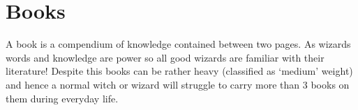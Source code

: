 \chapter{Books}\label{S:Books}

\newcommand\book[2]
{
	\vspace{2 ex}
	\small
	\vbox{
	{\bf #1}
	
	#2
	}
	\normalsize
}
\def\spellIntro{Spellbooks contain within them the information needed to cast spells. The rules for casting from spellbooks are detailed on page \pageref{S:Memory}.

For each topic\comma{} 5 books are listed in descending order. Each of these 5 books corresponds to one block of spells listed on page \pageref{S:SpellList}. {\it The Forbidden Arts}\comma{} the second Dark\minus{}Arts spellbook therefore contains all the level\minus{}2 Dark Arts spells\comma{} but not the level one spells. 
}
\def\normalIntro{Normal books fall into many different categories\comma{}. The list below contains an example of some of the most common topics of wizarding books\comma{} and a few examples of the most famous texts within those categories\comma{} where relevant. }

A book is a compendium of knowledge\comma{} contained between two pages. As wizards\comma{} words and knowledge are power \minus{}\minus{} so all good wizards are familiar with their literature! Despite this\comma{} books can be rather heavy (classified as `medium' weight)\comma{} and hence a normal witch or wizard will struggle to carry more than 3 books on them during everyday life. 
\vspace{-3 ex}
\def\w{8}

